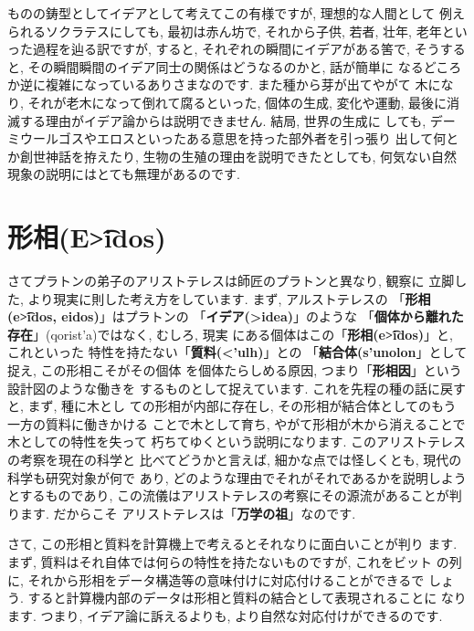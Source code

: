 ものの鋳型としてイデアとして考えてこの有様ですが, 理想的な人間として
例えられるソクラテスにしても, 最初は赤ん坊で, それから子供, 若者, 壮年,
 老年といった過程を辿る訳ですが, すると, それぞれの瞬間にイデアがある筈で,
 そうすると, その瞬間瞬間のイデア同士の関係はどうなるのかと, 話が簡単に
なるどころか逆に複雑になっているありさまなのです. また種から芽が出てやがて
木になり, それが老木になって倒れて腐るといった, 個体の生成, 変化や運動,
 最後に消滅する理由がイデア論からは説明できません. 結局, 世界の生成に
しても, デーミウールゴスやエロスといったある意思を持った部外者を引っ張り
出して何とか創世神話を拵えたり, 生物の生殖の理由を説明できたとしても,
 何気ない自然現象の説明にはとても無理があるのです.


\section{形相(\textgreek{E\t{>i}dos})}

さてプラトンの弟子のアリストテレスは師匠のプラトンと異なり, 観察に
立脚した, より現実に則した考え方をしています. まず, アルストテレスの
「\textbf{\textbf{形相(\textgreek{e\t{>i}dos}, eidos)}}」はプラトンの
「\textbf{イデア(\textgreek{>idea})}」のような
「\textbf{個体から離れた存在}」(\textgreek{qorist'a})ではなく, むしろ, 現実
にある個体はこの「\textbf{形相(\textgreek{e\t{>i}dos})}」と, これといった
特性を持たない「\textbf{質料(\textgreek{<'ulh})}」との
「\textbf{結合体(\textgreek{s'unolon}}」として捉え, この形相こそがその個体
を個体たらしめる原因, つまり「\textbf{形相因}」という設計図のような働きを
するものとして捉えています. これを先程の種の話に戻すと, まず, 種に木とし
ての形相が内部に存在し, その形相が結合体としてのもう一方の質料に働きかける
ことで木として育ち, やがて形相が木から消えることで木としての特性を失って
朽ちてゆくという説明になります. このアリストテレスの考察を現在の科学と
比べてどうかと言えば, 細かな点では怪しくとも, 現代の科学も研究対象が何で
あり, どのような理由でそれがそれであるかを説明しようとするものであり, 
 この流儀はアリストテレスの考察にその源流があることが判ります. だからこそ
アリストテレスは「\textbf{万学の祖}」なのです.
\newline

さて, この形相と質料を計算機上で考えるとそれなりに面白いことが判り
ます. まず, 質料はそれ自体では何らの特性を持たないものですが, これをビット
の列に, それから形相をデータ構造等の意味付けに対応付けることができるで
しょう. すると計算機内部のデータは形相と質料の結合として表現されることに
なります. つまり, イデア論に訴えるよりも, より自然な対応付けができるのです.


